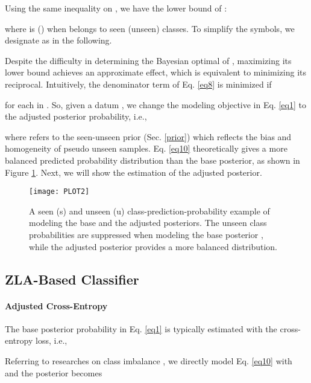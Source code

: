 \documentclass{article}
\begin{document}
    
	Using the same inequality on , we have the lower bound of :
    \vspace{-1.ex}
	
    where  is  () when  belongs to seen (unseen) classes. To simplify the symbols, we designate  as  in the following.
    
	Despite the difficulty in determining the Bayesian optimal of , maximizing its lower bound achieves an approximate effect, which is equivalent to minimizing its reciprocal. Intuitively, the denominator term of Eq. \ref{eq8} is minimized if

	for each  in . So, given a datum , we change the modeling objective in Eq. \ref{eq1} to the adjusted posterior probability, i.e.,
       \vspace{-0.3ex}
	
where  refers to the seen-unseen prior (Sec. \ref{prior}) which reflects the bias and homogeneity of pseudo unseen samples. Eq. \ref{eq10} theoretically gives a more balanced predicted probability distribution than the base posterior, as shown in Figure \ref{fig2}. Next, we will show the estimation of the adjusted posterior.
	\begin{figure}[t]
		\centering
		\subfigure
		{
			\texttt{[image: PLOT2]}
		}
		\vspace{-1.5ex}
		\caption{A seen (s) and unseen (u) class-prediction-probability example of modeling the base and the adjusted posteriors. The unseen class probabilities are suppressed when modeling the base posterior , while the adjusted posterior  provides a more balanced distribution.}
        
		\vspace{-1.6ex}
		\label{fig2}
	\end{figure}
   \vspace{-1.9ex}
	\subsection{ZLA-Based Classifier}
\paragraph{Adjusted Cross-Entropy}
The base posterior probability in Eq. \ref{eq1} is typically estimated with the cross-entropy loss, i.e.,

    
	Referring to researches on class imbalance \cite{tan2020equalization,menon2020long}, we directly model Eq. \ref{eq10} with  and the posterior becomes
\end{document}
